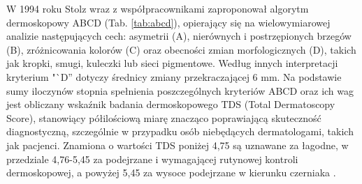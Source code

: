 W 1994 roku Stolz wraz z współpracownikami zaproponował algorytm dermoskopowy ABCD (Tab. \ref{tab:abcd}), opierający się na wielowymiarowej analizie następujących cech: asymetrii (A), nierównych i postrzępionych brzegów (B), zróżnicowania kolorów (C) oraz obecności zmian morfologicznych (D), takich jak kropki, smugi, kuleczki lub sieci pigmentowe.
Według innych interpretacji kryterium "`D'' dotyczy średnicy zmiany przekraczającej 6 mm.
Na podstawie sumy iloczynów stopnia spełnienia poszczególnych kryteriów ABCD oraz ich wag jest obliczany wskaźnik badania dermoskopowego TDS (Total Dermatoscopy Score), stanowiący półilościową miarę znacząco poprawiającą skuteczność diagnostyczną, szczególnie w przypadku osób niebędących dermatologami, takich jak pacjenci.
Znamiona o wartości TDS poniżej 4,75 są uznawane za łagodne, w przedziale 4,76-5,45 za podejrzane i wymagającej rutynowej kontroli dermoskopowej, a powyżej 5,45 za wysoce podejrzane w kierunku czerniaka \cite{Nachbar_Stolz_Merkle_Cognetta_Vogt_Landthaler_Bilek_Braun-Falco_Plewig_1994, Wysocki_2016}.

